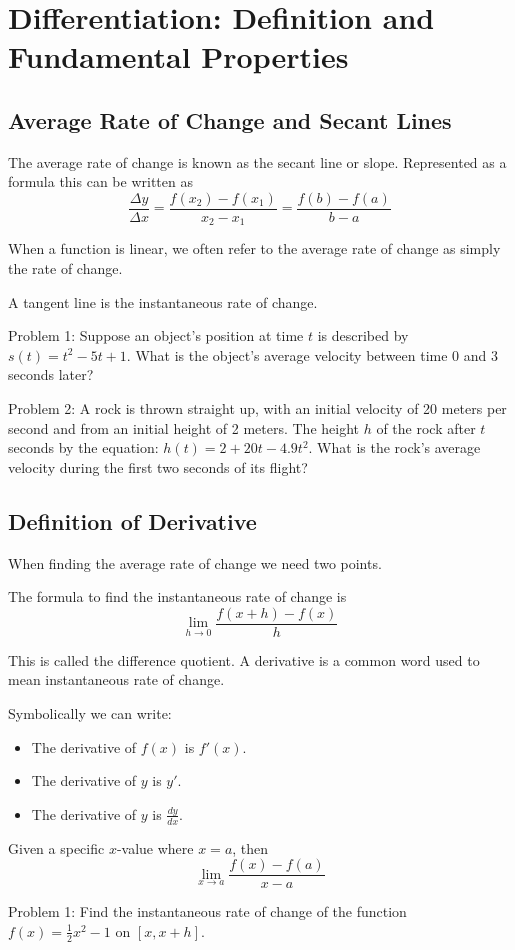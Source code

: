 \documentclass[../abcalc.tex]{subfiles}
\begin{document}
\chapter{Differentiation: Definition and Fundamental Properties}
\section{Average Rate of Change and Secant Lines}
The average rate of change is known as the secant line or slope. Represented as a formula this can be written as 
\[\frac{\Delta y}{\Delta x} = \frac{f(x_2)-f(x_1)}{x_2-x_1} = \frac{f(b)-f(a)}{b-a}\]

When a function is linear, we often refer to the average rate of change as simply the rate of change. 

A tangent line is the instantaneous rate of change.

Problem 1: Suppose an object's position at time $t$ is described by $s(t)=t^2-5t+1$. What is the object's average velocity between time 0 and 3 seconds later?

Problem 2: A rock is thrown straight up, with an initial velocity of 20 meters per second and from an initial height of 2 meters. The height 
$h$ of the rock after $t$ seconds by the equation: $h(t)=2+20t-4.9t^2$. What is the rock's average velocity during the first two seconds of its flight?
\section{Definition of Derivative}
When finding the average rate of change we need two points.

The formula to find the instantaneous rate of change is
\[\lim_{h\to 0}\frac{f(x+h)-f(x)}{h}\]

This is called the difference quotient. A derivative is a common word used to mean instantaneous rate of change. 

Symbolically we can write:
\begin{itemize}
    \item The derivative of $f(x)$ is $f'(x)$.
    \item The derivative of $y$ is $y'$.
    \item The derivative of $y$ is $\frac{dy}{dx}$.
\end{itemize}

Given a specific $x$-value where $x=a$, then 
\[\lim_{x\to a}\frac{f(x)-f(a)}{x-a}\]

Problem 1: Find the instantaneous rate of change of the function $f(x)=\frac{1}{2}x^2-1$ on $[x,x+h]$.
\end{document}
